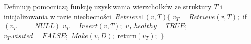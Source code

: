 \documentclass{pracamgr}
\begin{document}
    Definiuję pomocniczą funkcję uzyskiwania wierzchołków ze struktury $T$ i inicjalizowania w razie nieobecności:\newline\newline
    \hspace*{100pt}$Retrieve1(v,T)\{$\newline
    \hspace*{116pt}	$v_T=Retrieve(v,T);$\newline
    \hspace*{116pt}	if$(v_T==NULL)$\newline
    \hspace*{132pt}		$v_T=Insert(v,T);$\newline
    \hspace*{132pt}		$v_T.healthy=TRUE;$\newline
    \hspace*{132pt}		$v_T.visited=FALSE;$\newline
    \hspace*{132pt}		$Make(v,D);$\newline
    \hspace*{116pt}	return$(v_T);$\newline
    \hspace*{100pt}$\}$\newline
    
\end{document}
